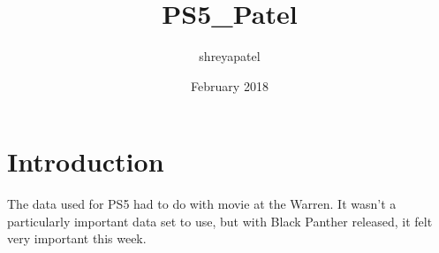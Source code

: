 \documentclass{article}
\title{PS5_Patel}
\author{shreyapatel }
\date{February 2018}
\begin{document}
\maketitle

\section{Introduction}

The data used for PS5 had to do with movie at the Warren. It wasn't a particularly important data set to use, but with Black Panther released, it felt very important this week.
\end{document}
